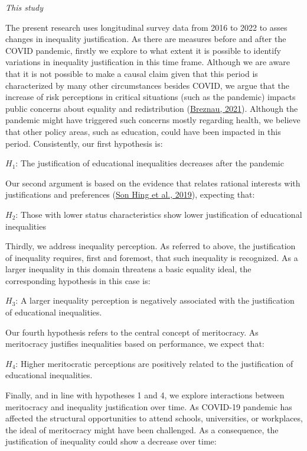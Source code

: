 \documentclass[
  12pt,
  a4paper,
]{article}
\begin{document}
\emph{This study}

The present research uses longitudinal survey data from 2016 to 2022 to
asses changes in inequality justification. As there are measures before
and after the COVID pandemic, firstly we explore to what extent it is
possible to identify variations in inequality justification in this time
frame. Although we are aware that it is not possible to make a causal
claim given that this period is characterized by many other
circumstances besides COVID, we argue that the increase of risk
perceptions in critical situations (such as the pandemic) impacts public
concerns about equality and redistribution
(\protect\hyperlink{ref-breznau_welfare_2021}{Breznau, 2021}). Although
the pandemic might have triggered such concerns mostly regarding health,
we believe that other policy areas, such as education, could have been
impacted in this period. Consistently, our first hypothesis is:

\(H_1\): The justification of educational inequalities decreases after
the pandemic

Our second argument is based on the evidence that relates rational
interests with justifications and preferences
(\protect\hyperlink{ref-sonhing_failure_2019}{Son Hing et al., 2019}),
expecting that:

\(H_2\): Those with lower status characteristics show lower
justification of educational inequalities

Thirdly, we address inequality perception. As referred to above, the
justification of inequality requires, first and foremost, that such
inequality is recognized. As a larger inequality in this domain
threatens a basic equality ideal, the corresponding hypothesis in this
case is:

\(H_3\): A larger inequality perception is negatively associated with
the justification of educational inequalities.

Our fourth hypothesis refers to the central concept of meritocracy. As
meritocracy justifies inequalities based on performance, we expect that:

\(H_4\): Higher meritocratic perceptions are positively related to the
justification of educational inequalities.

Finally, and in line with hypotheses 1 and 4, we explore interactions
between meritocracy and inequality justification over time. As COVID-19
pandemic has affected the structural opportunities to attend schools,
universities, or workplaces, the ideal of meritocracy might have been
challenged. As a consequence, the justification of inequality could show
a decrease over time:
\end{document}
